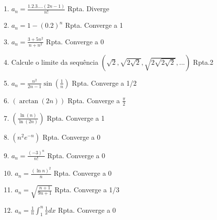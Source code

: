 \begin{itemize}
	\item[1.] $a_{n}=\frac{1.2.3....(2n-1)}{n!}$ \quad \quad Rpta. Diverge
\end{itemize}
\begin{itemize}
	\item[2.] $a_{n}=1-(0.2)^{n}$ \quad \quad Rpta. Converge a 1
\end{itemize}
\begin{itemize}
	\item[3.]  $a_{n}=\frac{3+5n^{2}}{n+n^{2}}$ \quad \quad Rpta. Converge a 0
\end{itemize}
\begin{itemize}
	\item[4.] Calcule o limite da sequência $\left(  \sqrt{2},\sqrt{2\sqrt{2}},\sqrt{2\sqrt{2\sqrt{2}}}, ...\right)  $ \quad \quad Rpta.2
\end{itemize}
\begin{itemize}
	\item[5.]$a_{n}=\frac{n^{2}}{2n-1}\sin (\frac{1}{n})$ \quad \quad Rpta. Converge a 1/2
\end{itemize}
\begin{itemize}
	\item[6.] $\left(  \arctan(2n)\right)  $ \quad \quad Rpta. Converge a $\frac{\pi}{2}$
\end{itemize}
\begin{itemize}
	\item [7.] $\left(  \frac{\ln(n)}{\ln(2n)}\right) $ \quad \quad Rpta. Converge a 1
\end{itemize}
\begin{itemize}
	\item [8.] $\left(  n^{2}e^{-n}\right) $ \quad \quad Rpta. Converge a 0
\end{itemize}
\begin{itemize}
	\item [9.] $a_{n}=\frac{(-3)^{n}}{n!}$ \quad \quad Rpta. Converge a 0
\end{itemize}
\begin{itemize}
	\item [10.] $a_{n}=\frac{(\ln n)^{2}}{n}$ \quad \quad Rpta. Converge a 0
\end{itemize}
\begin{itemize}
	\item [11.] $a_{n}=\sqrt{\frac{n+1}{9n+1}}$ \quad\quad Rpta. Converge a 1/3
\end{itemize}
\begin{itemize}
	\item [12.] $a_{n}=\frac{1}{n}\int_{1}^{n}\frac{1}{x}dx$ \quad\quad Rpta. Converge a 0
\end{itemize}

